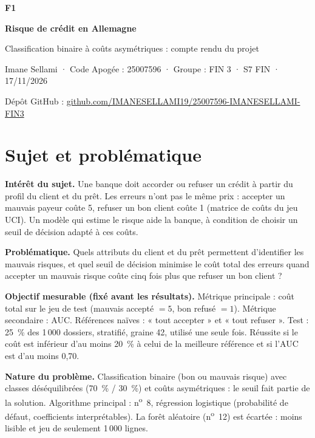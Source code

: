 \documentclass[11pt,a4paper]{article}
\begin{document}
\begin{center}
{\color{navy}\fontsize{26}{30}\selectfont\bfseries F1\par}
\vspace{2pt}
{\color{navy}\fontsize{20}{24}\selectfont\bfseries Risque de crédit en Allemagne\par}
\vspace{4pt}
{\large Classification binaire à coûts asymétriques : compte rendu du projet\par}
\vspace{4pt}
{\small Imane Sellami · Code Apogée : 25007596 · Groupe : FIN 3 · S7 FIN · 17/11/2026\par}
{\small Dépôt GitHub : \href{https://github.com/IMANESELLAMI19/25007596-IMANESELLAMI-FIN3}{github.com/IMANESELLAMI19/25007596-IMANESELLAMI-FIN3}\par}
\end{center}

\section{Sujet et problématique}

\textbf{Intérêt du sujet.} Une banque doit accorder ou refuser un crédit à partir du profil du client et du prêt. Les erreurs n'ont pas le même prix : accepter un mauvais payeur coûte 5, refuser un bon client coûte 1 (matrice de coûts du jeu UCI). Un modèle qui estime le risque aide la banque, à condition de choisir un seuil de décision adapté à ces coûts.

\textbf{Problématique.} Quels attributs du client et du prêt permettent d'identifier les mauvais risques, et quel seuil de décision minimise le coût total des erreurs quand accepter un mauvais risque coûte cinq fois plus que refuser un bon client ?

\textbf{Objectif mesurable (fixé avant les résultats).} Métrique principale : coût total sur le jeu de test (mauvais accepté $= 5$, bon refusé $= 1$). Métrique secondaire : AUC. Références naïves : « tout accepter » et « tout refuser ». Test : 25~\% des 1\,000 dossiers, stratifié, graine 42, utilisé une seule fois. Réussite si le coût est inférieur d'au moins 20~\% à celui de la meilleure référence et si l'AUC est d'au moins 0,70.

\textbf{Nature du problème.} Classification binaire (bon ou mauvais risque) avec classes déséquilibrées (70~\% / 30~\%) et coûts asymétriques : le seuil fait partie de la solution. Algorithme principal : n\textsuperscript{o}~8, régression logistique (probabilité de défaut, coefficients interprétables). La forêt aléatoire (n\textsuperscript{o}~12) est écartée : moins lisible et jeu de seulement 1\,000 lignes.
\end{document}

